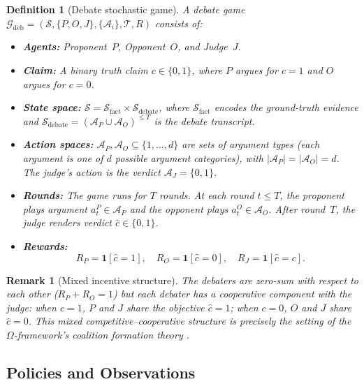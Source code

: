 \documentclass[11pt,a4paper]{article}
\newtheorem{definition}[theorem]{Definition}
\newtheorem{remark}[theorem]{Remark}
\newcommand{\cG}{\mathcal{G}}
\newcommand{\cS}{\mathcal{S}}
\newcommand{\cA}{\mathcal{A}}
\begin{document}
\begin{definition}[Debate stochastic game]
\label{def:debate-game}
A \emph{debate game} $\cG_{\text{deb}} = (\cS, \{P, O, J\}, \{\cA_i\}, \mathcal{T}, R)$ consists of:
\begin{itemize}
    \item \textbf{Agents:} Proponent~$P$, Opponent~$O$, and Judge~$J$.
    \item \textbf{Claim:} A binary truth claim $c \in \{0, 1\}$, where $P$
    argues for $c = 1$ and $O$ argues for $c = 0$.
    \item \textbf{State space:} $\cS = \cS_{\text{fact}} \times \cS_{\text{debate}}$,
    where $\cS_{\text{fact}}$ encodes the ground-truth evidence and
    $\cS_{\text{debate}} = (\cA_P \cup \cA_O)^{\leq T}$ is the debate transcript.
    \item \textbf{Action spaces:} $\cA_P, \cA_O \subseteq \{1, \ldots, d\}$
    are sets of argument types (each argument is one of $d$ possible
    argument categories), with $|\cA_P| = |\cA_O| = d$. The judge's action
    is the verdict $\cA_J = \{0, 1\}$.
    \item \textbf{Rounds:} The game runs for $T$ rounds. At each round
    $t \leq T$, the proponent plays argument $a_t^P \in \cA_P$ and the
    opponent plays $a_t^O \in \cA_O$. After round~$T$, the judge renders
    verdict $\hat{c} \in \{0, 1\}$.
    \item \textbf{Rewards:}
    \begin{equation}\label{eq:debate-rewards}
    R_P = \mathbf{1}[\hat{c} = 1], \quad
    R_O = \mathbf{1}[\hat{c} = 0], \quad
    R_J = \mathbf{1}[\hat{c} = c].
    \end{equation}
\end{itemize}
\end{definition}

\begin{remark}[Mixed incentive structure]
The debaters are \emph{zero-sum} with respect to each other ($R_P + R_O = 1$)
but each debater has a \emph{cooperative} component with the judge: when
$c = 1$, $P$ and $J$ share the objective $\hat{c} = 1$; when $c = 0$, $O$
and $J$ share $\hat{c} = 0$. This mixed competitive--cooperative structure
is precisely the setting of the $\Omega$-framework's coalition formation
theory \cite{shcherbinin2026coop}.
\end{remark}

\subsection{Policies and Observations}
\end{document}
